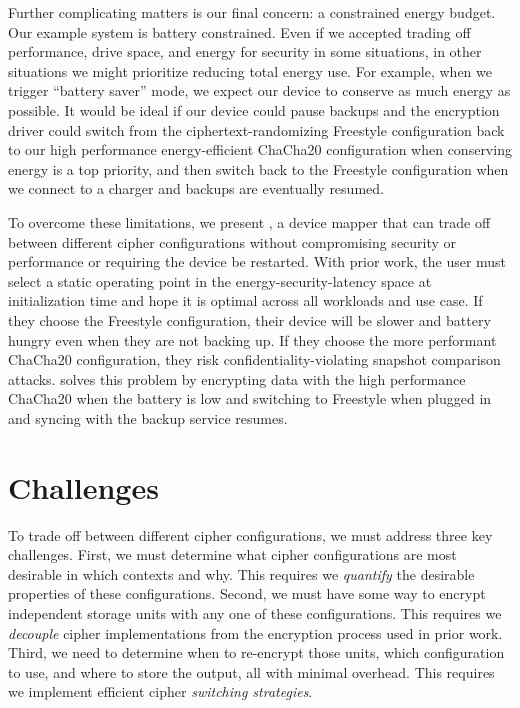 Further complicating matters is our final concern: a constrained energy budget.
Our example system is battery constrained. Even if we accepted trading off
performance, drive space, and energy for security in some situations, in other
situations we might prioritize reducing total energy use. For example, when we
trigger ``battery saver'' mode, we expect our device to conserve as much energy
as possible. It would be ideal if our device could pause backups and the
encryption driver could switch from the ciphertext-randomizing Freestyle
configuration back to our high performance energy-efficient ChaCha20
configuration when conserving energy is a top priority, and then switch back to
the Freestyle configuration when we connect to a charger and backups are
eventually resumed.

To overcome these limitations, we present \sys, a device mapper
that can trade off between different cipher configurations without
compromising security or performance or requiring the device be
restarted. With prior work, the user must select a static operating
point in the energy-security-latency space at initialization time and
hope it is optimal across all workloads and use case. If they choose
the Freestyle configuration, their device will be slower and battery
hungry even when they are not backing up. If they choose the more
performant ChaCha20 configuration, they risk confidentiality-violating
snapshot comparison attacks.  \sys solves this problem by
encrypting data with the high performance ChaCha20 when the battery is
low and switching to Freestyle when plugged in and syncing with the
backup service resumes.

\section{Challenges}
\label{sec:key-challenges}

To trade off between different cipher configurations, we must address three key
challenges. First, we must determine what cipher configurations are most
desirable in which contexts and why. This requires we \emph{quantify} the
desirable properties of these configurations. Second, we must have some way to
encrypt independent storage units with any one of these configurations. This
requires we \emph{decouple} cipher implementations from the encryption process
used in prior work. Third, we need to determine when to re-encrypt those units,
which configuration to use, and where to store the output, all with minimal
overhead. This requires we implement efficient cipher \emph{switching
strategies}.

